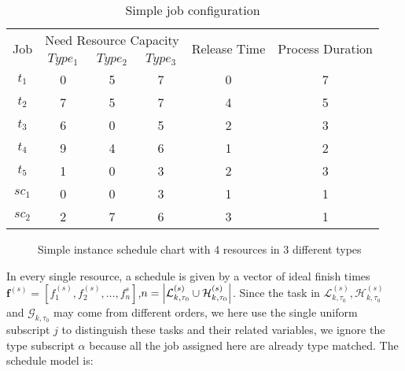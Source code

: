 \begin{table}[htbp]
  \centering
  \scriptsize
  \caption{Simple job configuration}
    \begin{tabular}{cccccc}
    \toprule
    \multicolumn{1}{c}{\multirow{2}[0]{*}{ Job}} & \multicolumn{3}{c}{Need Resource Capacity} & \multicolumn{1}{c}{\multirow{2}[0]{*}{Release Time}} & \multicolumn{1}{c}{\multirow{2}[0]{*}{Process Duration}} \\
    \multicolumn{1}{c}{} & $Type_1$ & $Type_2$ & $Type_3$ & \multicolumn{1}{c}{} & \multicolumn{1}{c}{} \\
    \midrule
    $t_1$ & 0     & 5     & 7     & 0     & 7 \\
    $t_2$ & 7     & 5     & 7     & 4     & 5 \\
    $t_3$ & 6     & 0     & 5     & 2     & 3 \\
    $t_4$ & 9	 & 4  & 6 & 1 &2 \\
    $t_5$ & 1 & 0 & 3 & 2 & 3\\
    $sc_1$ & 0     & 0     & 3    & 1     & 1 \\
    $sc_2$ & 2     & 7     & 6     & 3     & 1 \\
    \bottomrule
    \end{tabular}%
  \label{tab:simplejobconfiguration}%
\end{table}%
\begin{figure}[htbp]
	\centering
	\normalsize
	\resizebox{.8\textwidth}{!}{}
	\caption{Simple instance schedule chart with 4 resources in 3 different types}
	\label{fig:scheduleChart}
\end{figure}

In every single resource, a schedule is given by a vector of ideal finish times $\bm{f}^{(s)} = \left[f_1^{(s)}, f_2^{(s)},\dots,f^{s}_n\right]$,$n=\left|\mathcal{L}^{(s)}_{k,\tau_0}\cup\mathcal{H}^{(s)}_{k,\tau_0}\right|$. Since the task in $\mathcal{L}^{(s)}_{k,\tau_0},\mathcal{H}^{(s)}_{k,\tau_0}$ and $\mathcal{G}_{k,\tau_0}$ may come from different orders, we here use the single uniform subscript $j$ to distinguish these tasks and their related variables, we ignore the type subscript $\alpha$ because all the job assigned here are already type matched. The schedule model is:

